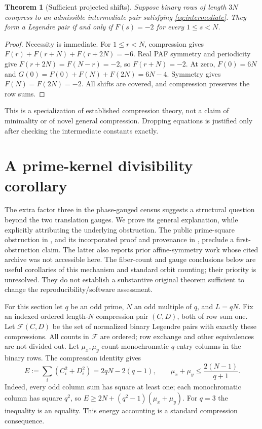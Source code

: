 \documentclass[11pt]{article}
\newtheorem{theorem}{Theorem}[section]
\begin{document}
\begin{theorem}[Sufficient projected shifts]\label{thm:projected}
Suppose binary rows of length $3N$ compress to an admissible intermediate
pair satisfying \eqref{eq:intermediate}. They form a Legendre pair if and
only if $F(s)=-2$ for every $1\le s<N$.
\end{theorem}
\begin{proof}
Necessity is immediate. For $1\le r<N$, compression gives
$F(r)+F(r+N)+F(r+2N)=-6$. Real PAF symmetry and periodicity give
$F(r+2N)=F(N-r)=-2$, so $F(r+N)=-2$. At zero, $F(0)=6N$ and
$G(0)=F(0)+F(N)+F(2N)=6N-4$. Symmetry gives $F(N)=F(2N)=-2$.
All shifts are covered, and compression preserves the row sums.
\end{proof}
This is a specialization of established compression theory, not a claim of
minimality or of novel general compression. Dropping equations is justified
only after checking the intermediate constants exactly.

\section{A prime-kernel divisibility corollary}\label{sec:fiber}
The extra factor three in the phase-gauged census suggests a structural
question beyond the two translation gauges. We prove its general explanation,
while explicitly attributing the underlying obstruction. The public
prime-square obstruction in \cite{kernelissue}, and its incorporated proof
and provenance in \cite{kernelreport}, preclude a first-obstruction claim.
The latter also reports prior affine-symmetry work whose cited archive was
not accessible here. The fiber-count and gauge conclusions below are useful
corollaries of this mechanism and standard orbit counting; their priority is
unresolved. They do not establish a substantive original theorem sufficient
to change the reproducibility/software assessment.

For this section let $q$ be an odd prime, $N$ an odd multiple of $q$, and
$L=qN$. Fix an indexed ordered length-$N$ compression pair $(C,D)$, both
of row sum one. Let $\mathcal F(C,D)$ be the set of normalized binary
Legendre pairs with exactly these compressions. All counts in $\mathcal F$
are ordered; row exchange and other equivalences are not divided out.
Let $\mu_x,\mu_y$ count monochromatic $q$-entry columns in the binary rows.
The compression identity gives
\begin{equation}\label{eq:fiberenergy}
 E:=\sum_i(C_i^2+D_i^2)=2qN-2(q-1),\qquad
 \mu_x+\mu_y\le\frac{2(N-1)}{q+1}.
\end{equation}
Indeed, every odd column sum has square at least one; each monochromatic
column has square $q^2$, so $E\ge2N+(q^2-1)(\mu_x+\mu_y)$.
For $q=3$ the inequality is an equality. This energy accounting is a
standard compression consequence.
\end{document}
